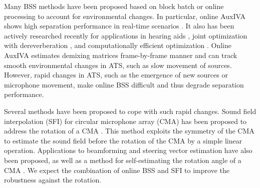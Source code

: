 \documentclass[sip,biber]{now-journal}
\begin{document}
Many BSS methods have been proposed based on block batch \cite{Koldovsky:2019:ICASSP,Koldovsky:2021:SP,Jansky:2022:ASMP} or online processing \cite{Kim:2010:CASI,Taniguchi:2014:HSCMA} to account for environmental changes.
In particular, online AuxIVA shows high separation performance in real-time scenarios \cite{Taniguchi:2014:HSCMA}.
It also has been actively researched recently for applications in hearing aids \cite{Sunohara:2017:ICASSP}, joint optimization with dereverberation \cite{Ueda:2021:ICASSP}, and computationally efficient optimization \cite{Nakashima:2023:ICASSP}.
Online AuxIVA estimates demixing matrices frame-by-frame manner and can track smooth environmental changes in ATS, such as slow movement of sources.
However, rapid changes in ATS, such as the emergence of new sources or microphone movement, make online BSS difficult and thus degrade separation performance.

Several methods have been proposed to cope with such rapid changes.
Sound field interpolation (SFI) for circular microphone array (CMA) has been proposed to address the rotation of a CMA \cite{Wakabayashi:2023:ASLP}.
This method exploits the symmetry of the CMA to estimate the sound field before the rotation of the CMA by a simple linear operation.
Applications to beamforming \cite{Wakabayashi:2021:ICASSP} and steering vector estimation \cite{Wakabayashi:2021:ASJ:A} have also been proposed,
as well as a method for self-estimating the rotation angle of a CMA \cite{Lian:2021:APSIPA}.
We expect the combination of online BSS and SFI to improve the robustness against the rotation.
\end{document}
